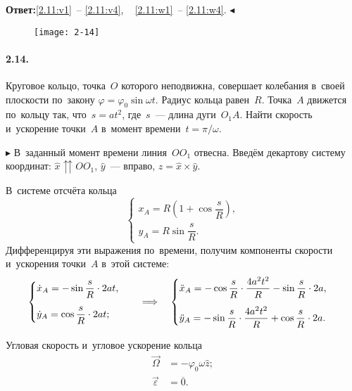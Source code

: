 \documentclass{weekly}
\begin{document}
\textbf{Ответ:}\quad \eqref{2.11:v1}~-- \eqref{2.11:v4}, ~
\eqref{2.11:w1}~-- \eqref{2.11:w4}.
\hfill $\blacktriangleleft$


\begin{wrapfigure}[6]{r}{4cm}\vspace{-5.5mm}
    \texttt{[image: 2-14]}
\end{wrapfigure}
\paragraph{2.14.} Круговое кольцо, точка~$O$ которого неподвижна,
совершает колебания в~своей плоскости по~закону
$\varphi = \varphi_0 \sin\omega t$. Радиус кольца равен~$R$.
Точка~$A$ движется по~кольцу так, что~$s = at^2$, где~$s$~---
длина дуги~$O_1 A$. Найти скорость и~ускорение точки~$A$
в~момент времени~$t = \pi/\omega$.

$\blacktriangleright$ В~заданный момент времени линия~$OO_1$ отвесна.
Введём декартову систему координат: $\hat x \upuparrows OO_1$,
$\hat y$~--- вправо, $\hat z = \hat x \times \hat y$.

В~системе отсчёта кольца
\begin{equation}
\begin{cases}
    x_A = R \left( 1 + \cos\dfrac{s}{R} \right), \\[2mm]
    y_A = R \sin\dfrac{s}{R}.
\end{cases}
\end{equation}
Дифференцируя эти выражения по~времени, получим
компоненты скорости и~ускорения точки~$A$ в~этой системе:
\begin{equation}
\begin{cases}
    \dot x_A = -\sin\dfrac{s}{R} \cdot 2at, \\[4mm]
    \dot y_A = \cos\dfrac{s}{R} \cdot 2at;
\end{cases} \quad \Longrightarrow \quad
\begin{cases}
    \ddot x_A = -\cos\dfrac{s}{R} \cdot \dfrac{4a^2 t^2}{R} -
            \sin\dfrac{s}{R} \cdot 2a, \\[4mm]
    \ddot y_A = -\sin\dfrac{s}{R} \cdot \dfrac{4a^2 t^2}{R} +
            \cos\dfrac{s}{R} \cdot 2a.
\end{cases}
\end{equation}

Угловая скорость и~угловое ускорение кольца
\begin{align}
    \vec\Omega &= -\varphi_0 \omega \hat z; \\
    \vec\varepsilon &= \overline{0}.
\end{align}
\end{document}
